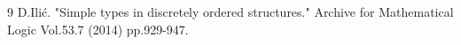 \begin{thebibliography}{9}
 D.Ili\'c. "Simple types in discretely ordered structures." Archive for Mathematical Logic Vol.53.7 (2014)  pp.929-947.
\end{thebibliography}
